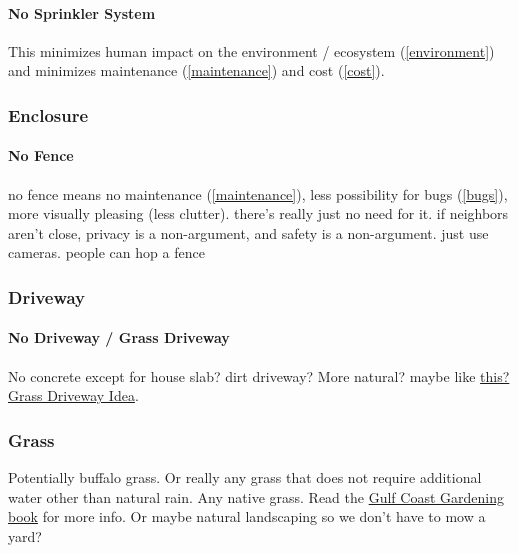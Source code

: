 \documentclass{article}
\begin{document}
\paragraph{No Sprinkler System} This minimizes human impact on the environment / ecosystem (\ref{environment}) and minimizes maintenance (\ref{maintenance}) and cost (\ref{cost}).

\subsubsection{Enclosure}
\paragraph{No Fence} no fence means no maintenance (\ref{maintenance}), less possibility for bugs (\ref{bugs}), more visually pleasing (less clutter). there's really just no need for it. if neighbors aren't close, privacy is a non-argument, and safety is a non-argument. just use cameras. people can hop a fence

\subsubsection{Driveway}
\paragraph{No Driveway / Grass Driveway}
No concrete except for house slab? dirt driveway? More natural? maybe like \href{https://i.pinimg.com/originals/46/4f/81/464f810811fef0bcdbaa828911b20c93.jpg}{this?}
\href{https://www.truegridpaver.com/natural-driveway-ideas/}{Grass Driveway Idea}.

\subsubsection{Grass}
Potentially buffalo grass. Or really any grass that does not require additional water other than natural rain. Any native grass. Read the \href{https://www.riveroaksgc.org/rocg-garden-book/}{Gulf Coast Gardening book} for more info.
Or maybe natural landscaping so we don't have to mow a yard?
\end{document}
